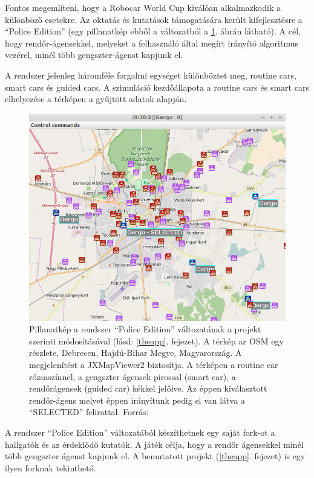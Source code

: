 \documentclass[a4paper,12pt]{report}
\begin{document}
\vspace{2mm}
Fontos megemlíteni, hogy a Robocar World Cup kiválóan alkalmazkodik a különböző esetekre. Az oktatás és kutatások támogatására került kifejlesztésre a ``Police Edition'' (egy pillanatkép ebből a változatból a \ref{police}. ábrán látható). A cél, hogy rendőr-ágensekkel, melyeket a felhasználó által megírt irányító algoritmus vezérel, minél több gengszter-ágenst kapjunk el.

\vspace{2mm}
A rendszer jelenleg háromféle forgalmi egységet különböztet meg, routine cars, smart cars és guided cars. A szimuláció kezdőállapota a routine cars és smart cars elhelyezése a térképen a gyűjtött adatok alapján.

\begin{figure}[h]
\centerline{
\includegraphics[width=6in]{img/copselected}}
\caption{Pillanatkép a rendszer ``Police Edition'' változatának a projekt szerinti módosításával (lásd: \ref{theapp}. fejezet). A térkép az OSM egy részlete, Debrecen, Hajdú-Bihar Megye, Magyarország. A megjelenítést a JXMapViewer2 \cite{jxmapv} biztosítja. A térképen a routine car rózsaszínnel, a gengszter ágensek pirossal (smart car), a rendőrágensek (guided car) kékkel jelölve. Az éppen kiválasztott rendőr-ágens melyet éppen irányítunk pedig el van látva a ``SELECTED'' felirattal. Forrás: \cite{infocomjournal} 
\label{police}}
\end{figure}

\vspace{2mm}
A rendszer ``Police Edition'' változatából készíthetnek egy saját fork-ot a hallgatók és az érdeklődő kutatók. A játék célja, hogy a rendőr ágensekkel minél több gengszter ágenst kapjunk el. A bemutatott projekt (\ref{theapp}. fejezet) is egy ilyen forknak tekinthető.
\end{document}
